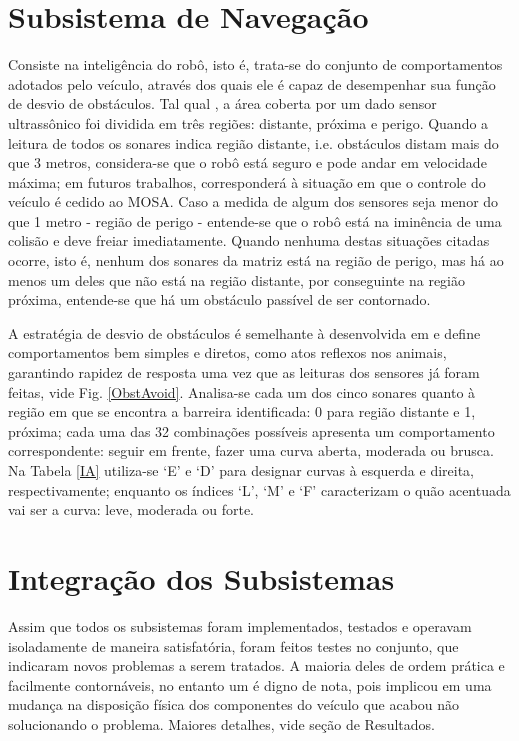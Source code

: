 \section{Subsistema de Navegação} %
Consiste na inteligência  do robô, isto é, trata-se do conjunto de comportamentos adotados pelo veículo, através dos quais ele é capaz de 
desempenhar sua função de desvio de obstáculos. %
Tal qual \cite{Artigo_3}, a área coberta por um dado sensor ultrassônico foi dividida em três regiões: distante, próxima e perigo.
Quando a leitura de todos os sonares indica região distante, i.e. obstáculos distam mais do que 3 metros, considera-se que o robô 
está seguro e pode andar em velocidade máxima; em futuros trabalhos, corresponderá à situação em que o controle do veículo é cedido ao MOSA.
Caso a medida de algum dos sensores seja menor do que 1 metro - região de perigo - entende-se que o robô está na iminência de uma colisão e deve 
freiar imediatamente.
Quando nenhuma destas situações citadas ocorre, isto é, nenhum dos sonares da matriz está na região de perigo, mas há ao menos um deles que não está 
na região distante, por conseguinte na região próxima, entende-se que há um obstáculo passível de ser contornado.

A estratégia de desvio de obstáculos é semelhante à desenvolvida em \cite{Artigo_1} e define comportamentos bem simples e diretos, como atos reflexos 
nos animais, garantindo rapidez de resposta uma vez que as leituras dos sensores já foram feitas, vide Fig. \ref{ObstAvoid}.
Analisa-se cada um dos cinco sonares quanto à região em que se encontra a barreira identificada: 0 para região distante e 1, próxima;
cada uma das 32 combinações possíveis apresenta um comportamento correspondente: seguir em frente, fazer uma curva aberta, moderada ou brusca.
Na Tabela \ref{IA} utiliza-se \textquoteleft E\textquoteright{} e  \textquoteleft D\textquoteright{} para designar curvas à esquerda e direita, 
respectivamente; enquanto os índices \textquoteleft L\textquoteright{},  \textquoteleft M\textquoteright{} e \textquoteleft F\textquoteright{} 
caracterizam o quão acentuada vai ser a curva: leve, moderada ou forte. %

\section{Integração dos Subsistemas}
Assim que todos os subsistemas foram implementados, testados e operavam isoladamente de maneira satisfatória, foram feitos testes no conjunto, que 
indicaram novos problemas a serem tratados. 
A maioria deles de ordem prática e facilmente contornáveis, no entanto um é digno de nota, pois implicou em uma mudança na disposição física dos 
componentes do veículo que acabou não solucionando o problema. Maiores detalhes, vide seção de Resultados.
